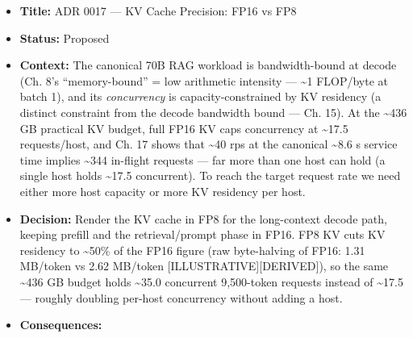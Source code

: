 \begin{itemize}
\tightlist
\item
  \textbf{Title:} ADR 0017 --- KV Cache Precision: FP16 vs FP8
\item
  \textbf{Status:} Proposed
\item
  \textbf{Context:} The canonical 70B RAG workload is bandwidth-bound at
  decode (Ch. 8's ``memory-bound'' = low arithmetic intensity ---
  \textasciitilde1 FLOP/byte at batch 1), and its \emph{concurrency} is
  capacity-constrained by KV residency (a distinct constraint from the
  decode bandwidth bound --- Ch. 15). At the \textasciitilde436 GB
  practical KV budget, full FP16 KV caps concurrency at
  \textasciitilde17.5 requests/host, and Ch. 17 shows that
  \textasciitilde40 rps at the canonical \textasciitilde8.6 s service
  time implies \textasciitilde344 in-flight requests --- far more than
  one host can hold (a single host holds \textasciitilde17.5
  concurrent). To reach the target request rate we need either more host
  capacity or more KV residency per host.
\item
  \textbf{Decision:} Render the KV cache in FP8 for the long-context
  decode path, keeping prefill and the retrieval/prompt phase in FP16.
  FP8 KV cuts KV residency to \textasciitilde50\% of the FP16 figure
  (raw byte-halving of FP16: 1.31 MB/token vs 2.62 MB/token
  \mbox{{[}ILLUSTRATIVE{]}}\hspace{0pt}\mbox{{[}DERIVED{]}}), so the same \textasciitilde436 GB
  budget holds \textasciitilde35.0 concurrent 9,500-token requests
  instead of \textasciitilde17.5 --- roughly doubling per-host
  concurrency without adding a host.
\item
  \textbf{Consequences:}


\end{itemize}
